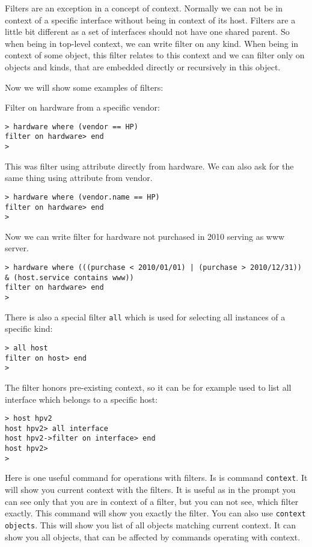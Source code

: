 \documentclass[deska]{subfiles}
\begin{document}
Filters are an exception in a concept of context. Normally we can not be in context of a specific interface without being
in context of its host. Filters are a little bit different as a set of interfaces should not have one shared parent. So
when being in top-level context, we can write filter on any kind. When being in context of some object, this filter
relates to this context and we can filter only on objects and kinds, that are embedded directly or recursively in this object.

Now we will show some examples of filters:

Filter on hardware from a specific vendor:
\begin{verbatim}
> hardware where (vendor == HP)
filter on hardware> end
>
\end{verbatim}

This was filter using attribute directly from hardware. We can also ask for the same thing using attribute from vendor.
\begin{verbatim}
> hardware where (vendor.name == HP)
filter on hardware> end
>
\end{verbatim}

Now we can write filter for hardware not purchased in 2010 serving as www server.

\begin{verbatim}
> hardware where (((purchase < 2010/01/01) | (purchase > 2010/12/31)) & (host.service contains www))
filter on hardware> end
>
\end{verbatim}

There is also a special filter {\tt all} which is used for selecting all instances of a specific kind:

\begin{verbatim}
> all host
filter on host> end
>
\end{verbatim}

The filter honors pre-existing context, so it can be for example used to list all interface which belongs to a specific
host:

\begin{verbatim}
> host hpv2
host hpv2> all interface
host hpv2->filter on interface> end
host hpv2>
>
\end{verbatim}

Here is one useful command for operations with filters. Is is command {\tt context}. It will show you current context
with the filters. It is useful as in the prompt you can see only that you are in context of a filter, but you can not
see, which filter exactly. This command will show you exactly the filter. You can also use {\tt context objects}. This
will show you list of all objects matching current context. It can show you all objects, that can be affected by commands
operating with context.
\end{document}
